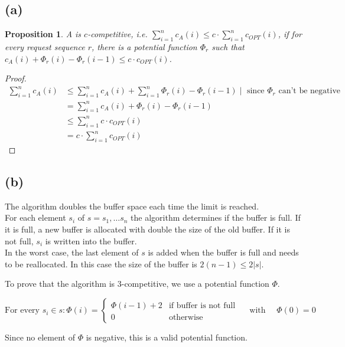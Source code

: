 \documentclass[a4paper,12pt]{scrartcl}
\newcounter{sheet}
\newtheorem{proposition}{Proposition}[sheet]
\begin{document}
\subsection*{(a)}
\begin{proposition} A is $c$-competitive, i.e. $\sum_{i=1}^n c_A(i) \leq c \cdot \sum_{i=1}^n c_{OPT}(i)$, if for every request sequence $r$, there is a potential function $\Phi_r$ such that $c_A(i) + \Phi_r(i) - \Phi_r(i-1) \leq c \cdot c_{OPT}(i)$. \end{proposition}
\begin{proof}
\begin{align*}
\sum_{i=1}^n c_A(i) & \leq \sum_{i=1}^n c_A(i) + \sum_{i=1}^n \Phi_r(i) - \Phi_r(i-1) \mid \text{ since } \Phi_r \text{ can't be negative} \\
& = \sum_{i=1}^n c_A(i) + \Phi_r(i) - \Phi_r(i-1) \\
& \leq \sum_{i=1}^n c \cdot c_{OPT}(i) \\
& = c \cdot \sum_{i=1}^n c_{OPT} (i)
\end{align*}
\end{proof}

\pagebreak

\subsection*{(b)}
The algorithm doubles the buffer space each time the limit is reached. \\
For each element $s_i$ of $s = s_1,\dots s_n$ the algorithm determines if the buffer is full. If it is full, a new buffer is allocated with double the size of the old buffer. If it is not full, $s_i$ is written into the buffer. \\

In the worst case, the last element of $s$ is added when the buffer is full and needs to be reallocated. In this case the size of the buffer is $2(n-1) \leq 2 |s|$.

To prove that the algorithm is $3$-competitive, we use a potential function $\Phi$.

\[\text{For every }s_i \in s: \Phi(i) = \begin{cases} \Phi(i-1)+2 & \text{if buffer is not full} \\ 0 & \text{otherwise} \end{cases} \quad \text{ with } \quad \Phi(0)=0\]

Since no element of $\Phi$ is negative, this is a valid potential function.
\end{document}
